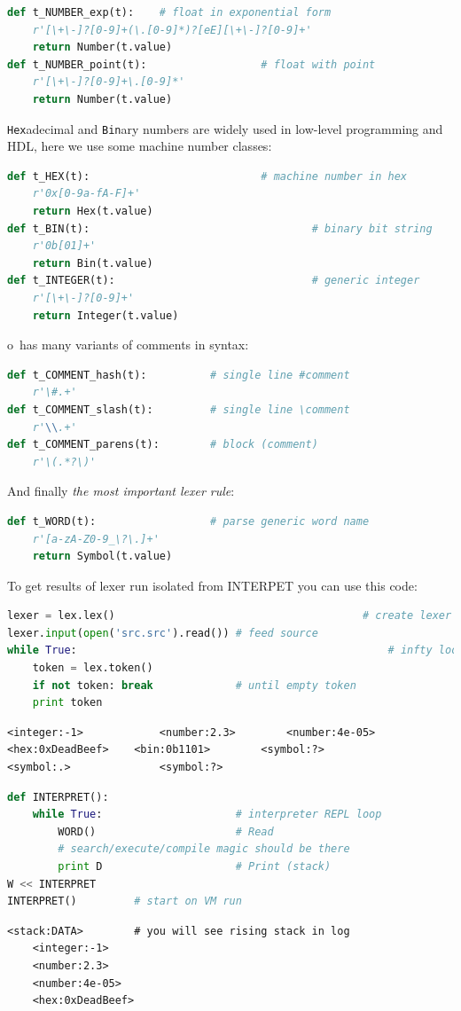 \medskip
\begin{lstlisting}[language=Python]
def t_NUMBER_exp(t):	# float in exponential form
	r'[\+\-]?[0-9]+(\.[0-9]*)?[eE][\+\-]?[0-9]+'
	return Number(t.value)
def t_NUMBER_point(t):					# float with point
	r'[\+\-]?[0-9]+\.[0-9]*'
	return Number(t.value)
\end{lstlisting}
\clearpage
\noindent \verb|Hex|adecimal and \verb|Bin|ary numbers are widely used in
low-level programming and HDL, here we use some machine number classes:
\begin{lstlisting}[language=Python]
def t_HEX(t):							# machine number in hex
    r'0x[0-9a-fA-F]+'
    return Hex(t.value)
def t_BIN(t):									# binary bit string
    r'0b[01]+'
    return Bin(t.value)
def t_INTEGER(t):								# generic integer
    r'[\+\-]?[0-9]+'
    return Integer(t.value)
\end{lstlisting}
\clearpage\noindent o\F\ has many variants of comments in syntax:
\begin{lstlisting}[language=Python]
def t_COMMENT_hash(t):			# single line #comment
	r'\#.+'
def t_COMMENT_slash(t):			# single line \comment
	r'\\.+'
def t_COMMENT_parens(t):		# block (comment)
	r'\(.*?\)'
\end{lstlisting}

\bigskip\noindent And finally \emph{the most important lexer rule}:
\begin{lstlisting}[language=Python]
def t_WORD(t): 					# parse generic word name
    r'[a-zA-Z0-9_\?\.]+'
    return Symbol(t.value)
\end{lstlisting}
\clearpage\noindent To get results of lexer run isolated from INTERPET you can
use this code:

\begin{lstlisting}[language=Python]
lexer = lex.lex()										# create lexer
lexer.input(open('src.src').read())	# feed source
while True:													# infty loop
    token = lex.token()
    if not token: break				# until empty token
    print token
\end{lstlisting}
\begin{lstlisting}
<integer:-1>			<number:2.3>		<number:4e-05>
<hex:0xDeadBeef>	<bin:0b1101>		<symbol:?>	
<symbol:.>				<symbol:?>
\end{lstlisting}



\clearpage\noindent
\begin{lstlisting}[language=Python]
def INTERPRET():
    while True:						# interpreter REPL loop
        WORD()						# Read
		# search/execute/compile magic should be there
        print D						# Print (stack)
W << INTERPRET
INTERPRET()			# start on VM run
\end{lstlisting}
\begin{lstlisting}
<stack:DATA>		# you will see rising stack in log
	<integer:-1>
	<number:2.3>
	<number:4e-05>
	<hex:0xDeadBeef>
\end{lstlisting}
\clearpage\noindent

